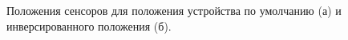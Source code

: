 \documentclass[12pt,fleqn]{article}
\begin{document}
\begin{figure}[h!]
\begin{minipage}[h!]{0.48\linewidth}
\end{minipage}
\hfill
\begin{minipage}[h!]{0.5\linewidth}
\end{minipage}
\caption{Положения сенсоров для положения устройства по умолчанию (а) и инверсированного положения (б).}
\label{position}
\end{figure}
\end{document}
